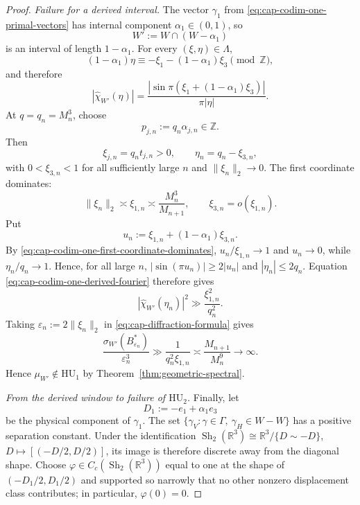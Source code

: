 \documentclass[11pt,reqno,a4paper]{amsart}
\numberwithin{equation}{section}
\theoremstyle{compact}
\theoremstyle{definition}
\theoremstyle{definition}
\newcommand{\HU}{\mathrm{HU}}
\newcommand{\Sh}{\operatorname{Sh}}
\begin{document}
\begin{proof}
\smallskip\noindent\emph{Failure for a derived interval.}
The vector $\gamma_1$ from \eqref{eq:cap-codim-one-primal-vectors} has internal
component $\alpha_1\in(0,1)$, so
\begin{equation}\label{eq:cap-codim-one-derived-window}
  W':=W\cap(W-\alpha_1)
\end{equation}
is an interval of length $1-\alpha_1$.  For every $(\xi,\eta)\in\Lambda$,
\[
  (1-\alpha_1)\eta
  \equiv-\xi_1-(1-\alpha_1)\xi_3\pmod{\mathbb Z},
\]
and therefore
\begin{equation}\label{eq:cap-codim-one-derived-fourier}
  |\widehat{\chi}_{W'}(\eta)|
  =\frac{|\sin\pi(\xi_1+(1-\alpha_1)\xi_3)|}{\pi|\eta|}.
\end{equation}
At $q=q_n=M_n^3$, choose
\begin{equation}\label{eq:cap-codim-one-special-dual-p}
  p_{j,n}:=q_n\alpha_{j,n}\in\mathbb Z.
\end{equation}
Then
\[
  \xi_{j,n}=q_nt_{j,n}>0,
  \qquad
  \eta_n=q_n-\xi_{3,n},
\]
with $0<\xi_{3,n}<1$ for all sufficiently large $n$ and
$\|\xi_n\|_2\to0$.  The first coordinate dominates:
\begin{equation}\label{eq:cap-codim-one-first-coordinate-dominates}
  \|\xi_n\|_2\asymp\xi_{1,n}
  \asymp\frac{M_n^3}{M_{n+1}},
  \qquad
  \xi_{3,n}=o(\xi_{1,n}).
\end{equation}
Put
\[
  u_n:=\xi_{1,n}+(1-\alpha_1)\xi_{3,n}.
\]
By \eqref{eq:cap-codim-one-first-coordinate-dominates},
$u_n/\xi_{1,n}\to1$ and $u_n\to0$, while
$\eta_n/q_n\to1$.  Hence, for all large $n$,
$|\sin(\pi u_n)|\geq 2|u_n|$ and $|\eta_n|\leq2q_n$.  Equation
\eqref{eq:cap-codim-one-derived-fourier} therefore gives
\begin{equation}\label{eq:cap-codim-one-derived-atom-size}
  |\widehat{\chi}_{W'}(\eta_n)|^2
  \gg\frac{\xi_{1,n}^2}{q_n^2}.
\end{equation}
Taking $\varepsilon_n:=2\|\xi_n\|_2$ in
\eqref{eq:cap-diffraction-formula} gives
\begin{equation}\label{eq:cap-codim-one-derived-nonhu}
  \frac{\sigma_{W'}(B_{\varepsilon_n}^*)}{\varepsilon_n^3}
  \gg\frac1{q_n^2\xi_{1,n}}
  \asymp\frac{M_{n+1}}{M_n^9}
  \longrightarrow\infty.
\end{equation}
Hence $\mu_{W'}\notin\HU_1$ by
Theorem~\ref{thm:geometric-spectral}.

\smallskip\noindent\emph{From the derived window to failure of $\HU_2$.}
Finally, let
\begin{equation}\label{eq:cap-codim-one-D1}
  D_1:=-e_1+\alpha_1e_3
\end{equation}
be the physical component of $\gamma_1$.  The set
\(
  \{\gamma_V:\gamma\in\Gamma,\ \gamma_H\in W-W\}
\)
has a positive separation constant.  Under the identification
$\Sh_2(\mathbb R^3)\cong\mathbb R^3/\{D\sim-D\}$,
$D\mapsto[(-D/2,D/2)]$, its image is therefore discrete away from the
diagonal shape.  Choose
$\varphi\in C_c(\Sh_2(\mathbb R^3))$ equal to one at the shape of
$(-D_1/2,D_1/2)$ and supported so narrowly that no other nonzero displacement
class contributes; in particular, $\varphi(0)=0$.


\end{proof}
\end{document}
